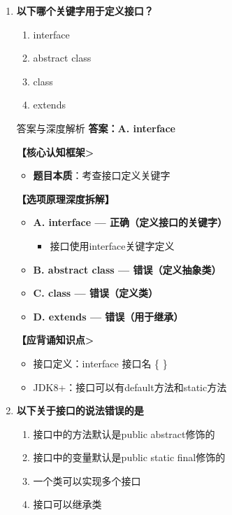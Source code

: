 \documentclass[12pt, a4paper]{ctexart}
\begin{document}
\begin{enumerate}[label=\textbf{\arabic*.}]
	      \vspace{1em}

	\item \textbf{以下哪个关键字用于定义接口？}
	      \begin{enumerate}[label=\Alph*.]
		      \item interface
		      \item abstract class
		      \item class
		      \item extends
	      \end{enumerate}

	      \begin{bluebox}{答案与深度解析}
		      \textbf{答案：A. interface}

		      \textbf{【核心认知框架>}
		      \begin{itemize}[leftmargin=*, nosep, label={}]
			      \item \textbf{题目本质}：考查接口定义关键字
		      \end{itemize}

		      \textbf{【选项原理深度拆解】}
		      \begin{itemize}[label={}, nosep]
			      \item \textbf{A. interface — 正确（定义接口的关键字）}
			      \begin{itemize}[label={}, nosep]
				      \item 接口使用interface关键字定义
			      \end{itemize}
			      \item \textbf{B. abstract class — 错误（定义抽象类）}
			      \item \textbf{C. class — 错误（定义类）}
			      \item \textbf{D. extends — 错误（用于继承）}
		      \end{itemize}

		      \textbf{【应背诵知识点>}
		      \begin{itemize}[label={}, nosep]
			      \item 接口定义：interface 接口名 \{ \}
			      \item JDK8+：接口可以有default方法和static方法
		      \end{itemize}
	      \end{bluebox}

	      \vspace{1em}

	\item \textbf{以下关于接口的说法错误的是}
	      \begin{enumerate}[label=\Alph*.]
		      \item 接口中的方法默认是public abstract修饰的
		      \item 接口中的变量默认是public static final修饰的
		      \item 一个类可以实现多个接口
		      \item 接口可以继承类
	      \end{enumerate}


\end{enumerate}
\end{document}
